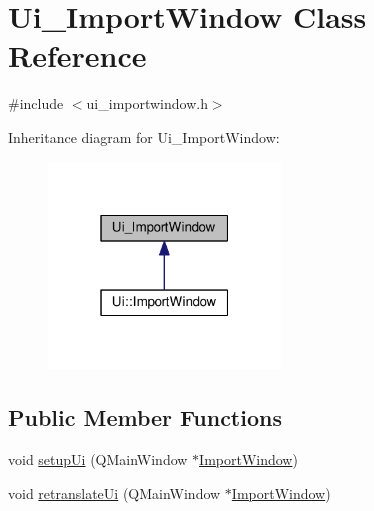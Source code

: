 \hypertarget{class_ui___import_window}{}\section{Ui\+\_\+\+Import\+Window Class Reference}
\label{class_ui___import_window}


{\ttfamily \#include $<$ui\+\_\+importwindow.\+h$>$}



Inheritance diagram for Ui\+\_\+\+Import\+Window\+:
\nopagebreak
\begin{figure}[H]
\begin{center}
\leavevmode
\includegraphics[width=175pt]{class_ui___import_window__inherit__graph}
\end{center}
\end{figure}
\subsection*{Public Member Functions}
\begin{DoxyCompactItemize}
\item 
void \hyperlink{class_ui___import_window_a1994d8f3faff15b4edc9a1198847c4be}{setup\+Ui} (Q\+Main\+Window $\ast$\hyperlink{class_import_window}{Import\+Window})
\item 
void \hyperlink{class_ui___import_window_ac7cf23e20c202e72ed26fbb2e6b719ad}{retranslate\+Ui} (Q\+Main\+Window $\ast$\hyperlink{class_import_window}{Import\+Window})
\end{DoxyCompactItemize}
